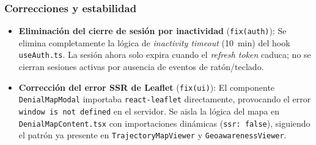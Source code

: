 \documentclass[12pt,a4paper]{article}
\begin{document}
\subsubsection*{Correcciones y estabilidad}
\begin{itemize}
    \item \textbf{Eliminación del cierre de sesión por inactividad} (\texttt{fix(auth)}): Se elimina completamente la lógica de \textit{inactivity timeout} (10~min) del hook \texttt{useAuth.ts}. La sesión ahora solo expira cuando el \textit{refresh token} caduca; no se cierran sesiones activas por ausencia de eventos de ratón/teclado.
    \item \textbf{Corrección del error SSR de Leaflet} (\texttt{fix(ui)}): El componente \texttt{DenialMapModal} importaba \texttt{react-leaflet} directamente, provocando el error \texttt{window is not defined} en el servidor. Se aisla la lógica del mapa en \texttt{DenialMapContent.tsx} con importaciones dinámicas (\texttt{ssr: false}), siguiendo el patrón ya presente en \texttt{TrajectoryMapViewer} y \texttt{GeoawarenessViewer}.
\end{itemize}
\end{document}
